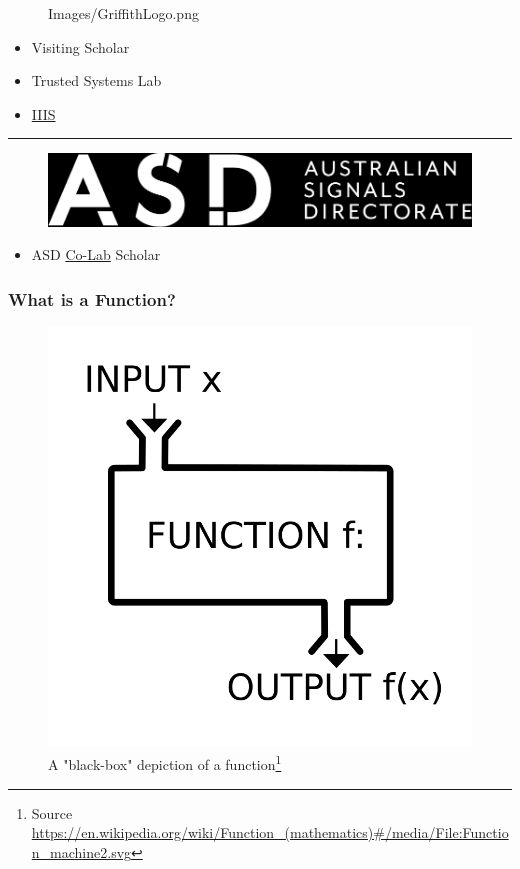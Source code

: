 \documentclass
  [hyperref={colorlinks = true,linkcolor = blue, 
             citecolor = blue, urlcolor = blue}
  ]{beamer}
\begin{document}
\begin{frame}[fragile]
\begin{minipage}{0.5\linewidth}
\begin{figure}[h]
        {Images/GriffithLogo.png}
    \end{figure}
  \end{minipage}
  \hfill
  \begin{minipage}{0.45\linewidth}
  \begin{itemize}
    \item Visiting Scholar
    \item Trusted Systems Lab
    \item \href{https://www.griffith.edu.au/institute-integrated-intelligent-systems}{IIIS}
  \end{itemize}
  \end{minipage}
\hrule
  \begin{minipage}{0.5\linewidth}
    \begin{figure}[h]
      \includegraphics[width=\linewidth]
        {Images/asd-logo.png}
    \end{figure}
  \end{minipage}
  \hfill
  \begin{minipage}{0.45\linewidth}
  \begin{itemize}
    \item ASD 
      \href{https://www.asd.gov.au/about/asd-anu-co-lab}{Co-Lab} 
      Scholar
  \end{itemize}
  \end{minipage}
\end{frame}

\end{document}
